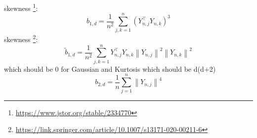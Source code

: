 skewness
\footnote{\url{https://www.jstor.org/stable/2334770}}:
\begin{equation}
    b_{1, d}=\frac{1}{n^{2}} \sum_{j, k=1}^{n}\left(Y_{n, j}^{\top} Y_{n, k}\right)^{3}
\end{equation}
skewness
\footnote{\url{https://link.springer.com/article/10.1007/s13171-020-00211-6}}:
\begin{equation}
    \widetilde{b}_{1, d}=\frac{1}{n^{2}} \sum_{j, k=1}^{n} Y_{n, j}^{\top} Y_{n, k}\left\|Y_{n, j}\right\|^{2}\left\|Y_{n, k}\right\|^{2}
\end{equation}
which should be 0 for Gaussian and Kurtosis which should be d(d+2)
\begin{equation}
    b_{2, d}=\frac{1}{n} \sum_{j=1}^{n}\left\|Y_{n, j}\right\|^{4}
\end{equation}


